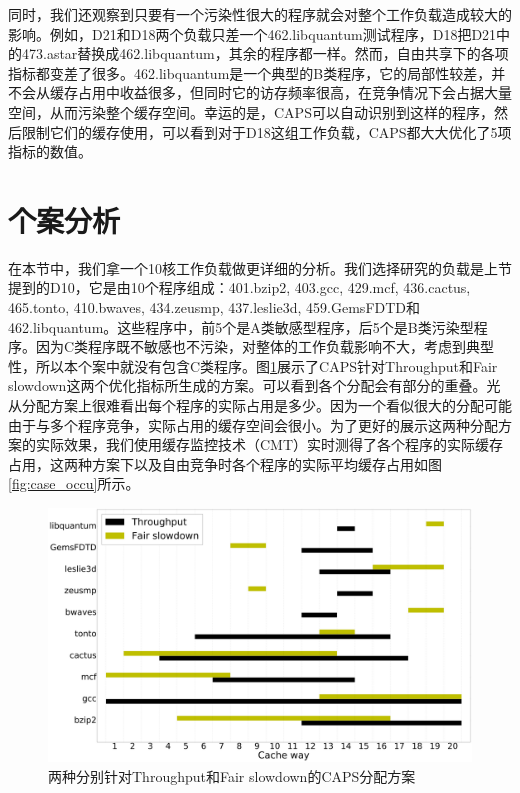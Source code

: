 同时，我们还观察到只要有一个污染性很大的程序就会对整个工作负载造成较大的影响。例如，D21和D18两个负载只差一个462.libquantum测试程序，D18把D21中的473.astar替换成462.libquantum，其余的程序都一样。然而，自由共享下的各项指标都变差了很多。462.libquantum是一个典型的B类程序，它的局部性较差，并不会从缓存占用中收益很多，但同时它的访存频率很高，在竞争情况下会占据大量空间，从而污染整个缓存空间。幸运的是，CAPS可以自动识别到这样的程序，然后限制它们的缓存使用，可以看到对于D18这组工作负载，CAPS都大大优化了5项指标的数值。

\section{个案分析}

在本节中，我们拿一个10核工作负载做更详细的分析。我们选择研究的负载是上节提到的D10，它是由10个程序组成：401.bzip2, 403.gcc, 429.mcf, 436.cactus, 465.tonto, 410.bwaves, 434.zeusmp, 437.leslie3d, 459.GemsFDTD和462.libquantum。这些程序中，前5个是A类敏感型程序，后5个是B类污染型程序。因为C类程序既不敏感也不污染，对整体的工作负载影响不大，考虑到典型性，所以本个案中就没有包含C类程序。图\ref{fig:case_scheme}展示了CAPS针对Throughput和Fair slowdown这两个优化指标所生成的方案。可以看到各个分配会有部分的重叠。光从分配方案上很难看出每个程序的实际占用是多少。因为一个看似很大的分配可能由于与多个程序竞争，实际占用的缓存空间会很小。为了更好的展示这两种分配方案的实际效果，我们使用缓存监控技术（CMT）实时测得了各个程序的实际缓存占用，这两种方案下以及自由竞争时各个程序的实际平均缓存占用如图\ref{fig:case_occu}所示。

\begin{figure}[htbp]
\centering
\includegraphics[width=0.95\columnwidth]{figures/case_study.pdf}
\caption{两种分别针对Throughput和Fair slowdown的CAPS分配方案}
\label{fig:case_scheme}
\end{figure} 

